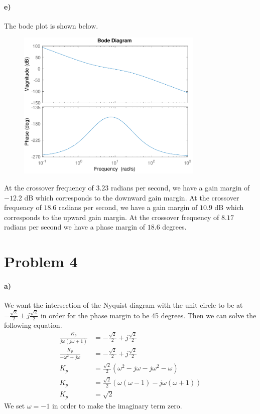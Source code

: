 \documentclass[12pt]{article}
\begin{document}
\paragraph{e)}

The bode plot is shown below.
\begin{figure}[H]
    \begin{center}
        \includegraphics[width=3.5in]{problem3e.pdf}
    \end{center}
\end{figure}
At the crossover frequency of \(3.23\) radians per second, we have a gain margin of \(-12.2\) dB which corresponds
to the downward gain margin. At the crossover frequency of \(18.6\) radians per second, we have a gain margin of
\(10.9\) dB which corresponds to the upward gain margin. At the crossover frequency of \(8.17\) radians per
second we have a phase margin of \(18.6\) degrees.

\section*{Problem 4}

\paragraph{a)}

We want the intersection of the Nyquist diagram with the unit circle to be at \(-\frac{\sqrt{2}}{2}\pm j\frac{\sqrt{2}}{2}\)
in order for the phase margin to be 45 degrees. Then we can solve the following equation.
\begin{align*}
    \frac{K_p}{j\omega(j\omega+1)}&=-\frac{\sqrt{2}}{2}+ j\frac{\sqrt{2}}{2}\\
    \frac{K_p}{-\omega^2+j\omega}&=-\frac{\sqrt{2}}{2}+ j\frac{\sqrt{2}}{2}\\
    K_p&=\frac{\sqrt{2}}{2}(\omega^2-j\omega -j\omega^2 -\omega)\\
    K_p&=\frac{\sqrt{2}}{2}(\omega(\omega-1)-j\omega(\omega+1))\\
    K_p&=\sqrt{2}
\end{align*}
We set \(\omega=-1\) in order to make the imaginary term zero.
\end{document}
